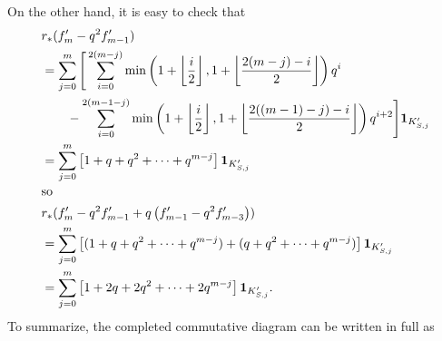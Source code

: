 On the other hand, it is easy to check that
\begin{align*}
  &r_\ast(f'_m -q^2 f'_{m-1}) \\
  &= \sum_{j=0}^m \Bigg[
      \sum_{i=0}^{2(m-j)} \min \left( 1 + \left\lfloor \frac i2 \right\rfloor,
      1 + \left\lfloor \frac{2(m-j)-i}{2} \right\rfloor \right) q^i \\
  &\qquad - \sum_{i=0}^{2(m-1-j)} \min \left( 1 + \left\lfloor \frac i2 \right\rfloor,
    1 + \left\lfloor \frac{2((m-1)-j)-i}{2} \right\rfloor \right) q^{i+2}
  \Bigg] \mathbf{1}_{K'_{S,j}} \\
  &= \sum_{j=0}^m \left[ 1+q+q^2+\dots+q^{m-j} \right] \mathbf{1}_{K'_{S,j}} \\
  \intertext{so}
  &r_\ast(f'_m -q^2 f'_{m-1} + q \left( f'_{m-1} - q^2 f'_{m-3} \right)) \\
  &= \sum_{j=0}^m \left[ (1+q+q^2+\dots+q^{m-j})+(q+q^2+\dots+q^{m-j}) \right] \mathbf{1}_{K'_{S,j}} \\
  &= \sum_{j=0}^m \left[ 1 + 2q + 2q^2 + \dots + 2q^{m-j} \right] \mathbf{1}_{K'_{S,j}}.
\end{align*}
To summarize, the completed commutative diagram can be written in full as
\begin{center}
\end{center}

